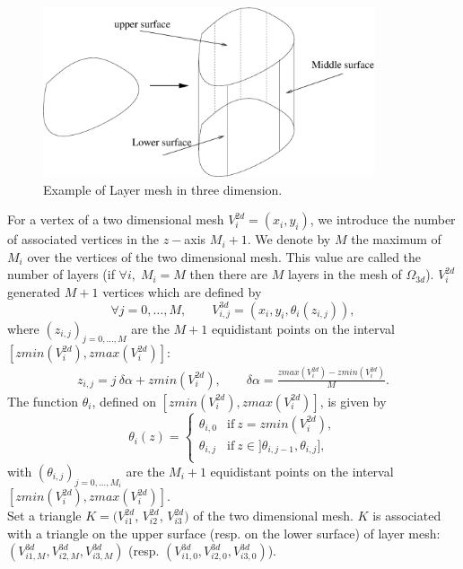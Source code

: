 \documentclass[a4paper,twoside,12pt]{book}
\begin{document}
\begin{figure}
\hspace*{4cm} \includegraphics[height=5cm]{buillayermesh}
\caption{Example of Layer mesh in three dimension.}
\label{fig-layermeshextend}
\end{figure}

For a vertex of a two dimensional mesh $V_{i}^{2d} = (x_{i},y_{i})$, we introduce the number of associated vertices in the $z-$axis $M_{i}+1$.
We denote by $M$ the maximum of $M_{i}$ over the vertices of the two dimensional mesh. This value are called the number of layers
(if $\forall i, \; M_{i}=M$ then there are $M$ layers in the mesh of $\Omega_{3d}$). $V_{i}^{2d}$ generated $M+1$ vertices which are defined by
$$
\forall j=0, \ldots, M, \qquad  V_{i,j}^{3d} = ( x_{i}, y_{i}, \theta_{i}(z_{i,j})  ),
$$
where $(z_{i,j})_{j=0,\ldots,M}$ are the $M+1$ equidistant points on the interval $[zmin( V_{i}^{2d} ), zmax( V_{i}^{2d})]$:
\begin{eqnarray*}
z_{i,j} =  j \: \delta \alpha + zmin(V_{i}^{2d}), \qquad \delta \alpha= \frac{ zmax( V_{i}^{2d} ) - zmin( V_{i}^{2d}) }{M}.
\end{eqnarray*}
The function $\theta_{i}$, defined on  $[zmin( V_{i}^{2d} ), zmax( V_{i}^{2d} )]$, is given by
$$
\theta_{i}(z) = \left \{
\begin{array}{cl}
\theta_{i,0} & \mbox{if} \: z=zmin(V_{i}^{2d}), \\
\theta_{i,j} & \mbox{if} \: z \in ] \theta_{i,j-1}, \theta_{i,j}],\\
\end{array}
\right.
$$
with $(\theta_{i,j})_{j=0,\ldots,M_{i}}$ are the $M_{i}+1$ equidistant points on the interval $[zmin( V_{i}^{2d} ), zmax( V_{i}^{2d} )]$.\\

Set a triangle $K=(V_{i1}^{2d}$, $V_{i2}^{2d}$, $V_{i3}^{2d})$ of the two dimensional mesh.
$K$ is associated with a triangle on the upper surface (resp. on the lower surface) of layer mesh:
$( V_{i1,M}^{3d}, V_{i2,M}^{3d}, V_{i3,M}^{3d} )$ (resp. $( V_{i1,0}^{3d}, V_{i2,0}^{3d}, V_{i3,0}^{3d})$).
\end{document}
